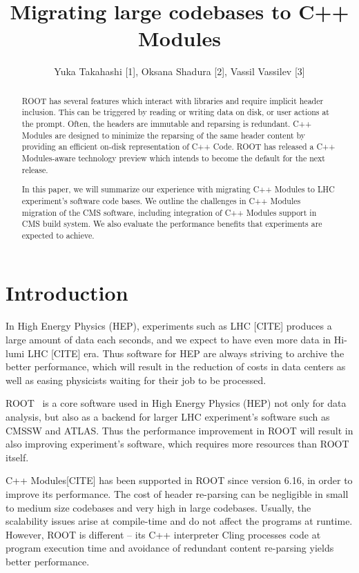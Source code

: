 \documentclass[12pt]{iopart}
\begin{document}
\title{Migrating large codebases to C++ Modules}

\author{Yuka Takahashi [1], Oksana Shadura [2], Vassil Vassilev [3]}
\address{[1] University of Tokyo, [2] University of Nebraska-Lincoln, [3] Princeton University}

\begin{abstract}
ROOT has several features which interact with libraries and require implicit header inclusion. This can be triggered by reading or writing data on disk, or user actions at the prompt. Often, the headers are immutable and reparsing is redundant. C++ Modules are designed to minimize the reparsing of the same header content by providing an efficient on-disk representation of C++ Code. ROOT has released a C++ Modules-aware technology preview which intends to become the default for the next release.

In this paper, we will summarize our experience with migrating C++ Modules to LHC experiment's software code bases. We outline the challenges in C++ Modules migration of the CMS software, including integration of C++ Modules support in CMS build system. We also evaluate the performance benefits that experiments are expected to achieve.
\end{abstract}

\section{Introduction}
\label{intro}

In High Energy Physics (HEP), experiments such as LHC [CITE] produces a large amount of data each seconds, and we expect to have even more data in Hi-lumi LHC [CITE] era. Thus software for HEP are always striving to archive the better performance, which will result in the reduction of costs in data centers as well as easing physicists waiting for their job to be processed.

ROOT~\cite{root} is a core software used in High Energy Physics (HEP) not only for data analysis, but also as a backend for larger LHC experiment's software such as CMSSW and ATLAS. Thus the performance improvement in ROOT will result in also improving experiment's software, which requires more resources than ROOT itself.

C++ Modules[CITE] has been supported in ROOT since version 6.16, in order to improve its performance. The cost of header re-parsing can be negligible in small to medium size codebases and very high in large codebases. Usually, the scalability issues arise at compile-time and do not affect the programs at runtime. However, ROOT is different -- its C++ interpreter Cling processes code at program execution time and avoidance of redundant content re-parsing yields better performance.
\end{document}
